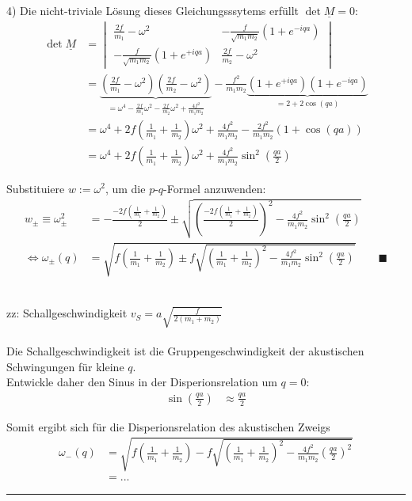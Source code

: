 \documentclass{article}
\newcommand{\lr}[1]{\left(#1\right)}
\begin{document}
{\newpage


	4) Die nicht-triviale Lösung dieses Gleichungsssytems erfüllt $\det \underline{M} = 0$:
		\begin{align*}
			\det \underline{M} &= 
			\begin{vmatrix}
				\frac{2f}{m_1} - \omega^2 & -\frac{f}{\sqrt{m_1 m_2}} \lr{ 1 + e^{-iqa} } \\
				-\frac{f}{\sqrt{m_1 m_2}} \lr{ 1 + e^{+iqa} } & \frac{2f}{m_2} - \omega^2
			\end{vmatrix} \\
			&= \underbrace{ \lr{ \frac{2f}{m_1} - \omega^2 } \lr{ \frac{2f}{m_2} - \omega^2 } }_{ = \omega^4 - \frac{2f}{m_1} \omega^2 - \frac{2f}{m_2} \omega^2 + \frac{4f^2}{m_1 m_2} } - \frac{f^2}{m_1 m_2} \underbrace{ \lr{ 1 + e^{+iqa} } \lr{ 1 + e^{-iqa} } }_{ = 2 + 2 \cos(qa)}  \\
			&= \omega^4 + 2f \lr{ \frac{1}{m_1} + \frac{1}{m_2} } \omega^2 + \frac{4f^2}{m_1 m_2} - \frac{2f^2}{m_1 m_2} \lr{ 1 + \cos(qa) } \\
			&= \omega^4 + 2f \lr{ \frac{1}{m_1} + \frac{1}{m_2} } \omega^2 + \frac{4f^2}{m_1 m_2} \sin^2 \lr{ \frac{qa}{2} }
		\end{align*}
	
	Substituiere $w := \omega^2$, um die $p$-$q$-Formel anzuwenden:
		\begin{align*}
			w_\pm \equiv \omega_\pm^2 &= - \frac{-2f\lr{ \frac{1}{m_1} + \frac{1}{m_2} }}{2} \pm \sqrt{ \lr{ \frac{-2f\lr{ \frac{1}{m_1} + \frac{1}{m_2} }}{2} }^2 - \frac{4f^2}{m_1 m_2} \sin^2 \lr{ \frac{qa}{2} } } \\
			\Leftrightarrow \omega_\pm(q) &= \sqrt{ f\lr{ \frac{1}{m_1} + \frac{1}{m_2} } \pm f \sqrt{ \lr{ \frac{1}{m_1} + \frac{1}{m_2} }^2 - \frac{4f^2}{m_1 m_2} \sin^2 \lr{ \frac{qa}{2} } } } \qquad \blacksquare
		\end{align*}


	\\
	zz: Schallgeschwindigkeit $v_S = a \sqrt{ \frac{f}{ 2(m_1 + m_2) } }$\\
	\\
	Die Schallgeschwindigkeit ist die Gruppengeschwindigkeit der akustischen Schwingungen für kleine $q$.\\
	Entwickle daher den Sinus in der Disperionsrelation um $q=0$:
		\begin{align*}
			\sin\lr{ \frac{qa}{2} } &\approx \frac{qa}{2}
		\end{align*}
	
	Somit ergibt sich für die Disperionsrelation des akustischen Zweigs
		\begin{align*}
			\omega_-(q) &= \sqrt{ f\lr{ \frac{1}{m_1} + \frac{1}{m_2} } - f \sqrt{ \lr{ \frac{1}{m_1} + \frac{1}{m_2} }^2 - \frac{4f^2}{m_1 m_2}  \lr{ \frac{qa}{2} }^2 } } \\
			&=...
		\end{align*}
	
		\hrule
}
\end{document}

